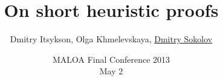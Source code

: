 

\title[\insertframenumber/\inserttotalframenumber~|~
On short heuristic proofs]{On short heuristic proofs}
\author[Sokolov D.O]{Dmitry Itsykson, Olga Khmelevskaya, \underline{Dmitry Sokolov}}

\date{MALOA Final Conference 2013\\
	May 2}



	\maketitle

	



